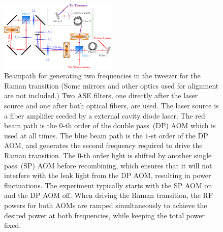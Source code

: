 \documentclass[aps,prl,twocolumn,10pt,superscriptaddress]{revtex4-1}
\begin{document}
\begin{figure}
  \includegraphics[width=0.5\textwidth]{imgs/raman_spectroscopy_raman_beampath.pdf}
  \caption{
    Beampath for generating two frequencies in the tweezer for the Raman transition
    (Some mirrors and other optics used for alignment are not included.)
    Two ASE filters, one directly after the laser source and one after both optical fibers, are used. The laser source is a fiber amplifier seeded by a external cavity diode laser.
    The red beam path is the $0$-th order of the double pass~(DP) AOM which is used at all times.
    The blue beam path is the $1$-st order of the DP AOM, and generates the second frequency required to drive the Raman transition.
    The $0$-th order light is shifted by another single pass~(SP) AOM before recombining, which ensures that it will not interfere with the leak light from the DP AOM, resulting in power fluctuations.
    The experiment typically starts with the SP AOM on and the DP AOM off.
    When driving the Raman transition, the RF powers for both AOMs are ramped simultaneously
    to achieve the desired power at both frequencies, while keeping the total power fixed.
    \label{f-beampath}
  }
\end{figure}
\end{document}
